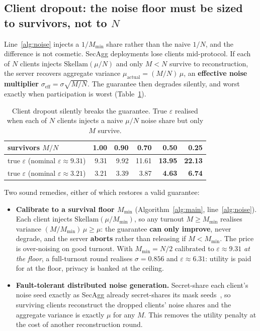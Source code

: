 \documentclass[pdflatex,sn-mathphys-num,12pt]{sn-jnl}
\theoremstyle{thmstyleone}%
\theoremstyle{thmstyletwo}%
\theoremstyle{thmstylethree}%
\newcommand{\eps}{\varepsilon}
\begin{document}
\subsection{Client dropout: the noise floor must be sized to survivors, not to
$N$}\label{sec:dropout}

Line~\ref{alg:noise} injects a $1/M_{\min}$ share rather than the naive $1/N$, and the
difference is not cosmetic. SecAgg deployments lose clients mid-protocol. If each of
$N$ clients injects $\mathrm{Skellam}(\mu/N)$ and only $M < N$ survive to
reconstruction, the server recovers aggregate variance
$\mu_{\text{actual}} = (M/N)\,\mu$, an \textbf{effective noise multiplier}
$\sigma_{\text{eff}} = \sigma\sqrt{M/N}$. The guarantee then degrades silently, and
worst exactly when participation is worst (Table~\ref{tab:dropout}).

\begin{table}[t]
  \centering
  \caption{Client dropout silently breaks the guarantee. True $\eps$ realised when
  each of $N$ clients injects a naive $\mu/N$ noise share but only $M$ survive.}
  \label{tab:dropout}
  \begin{tabular}{@{}lrrrrr@{}}
    \toprule
    survivors $M/N$ & 1.00 & 0.90 & 0.70 & 0.50 & 0.25 \\
    \midrule
    true $\eps$ (nominal $\eps \approx 9.31$) & 9.31 & 9.92 & 11.61 & \textbf{13.95} & \textbf{22.13} \\
    true $\eps$ (nominal $\eps \approx 3.21$) & 3.21 & 3.39 &  3.87 & \textbf{4.63}  & \textbf{6.74}  \\
    \bottomrule
  \end{tabular}
\end{table}

Two sound remedies, either of which restores a valid guarantee:

\begin{itemize}
  \item \textbf{Calibrate to a survival floor $M_{\min}$} (Algorithm~\ref{alg:main},
    line~\ref{alg:noise}). Each client injects $\mathrm{Skellam}(\mu / M_{\min})$, so any
    turnout $M \geq M_{\min}$ realises variance $(M/M_{\min})\,\mu \geq \mu$: the
    guarantee \textbf{can only improve}, never degrade, and the server \textbf{aborts}
    rather than releasing if $M < M_{\min}$. The price is over-noising on good turnout.
    With $M_{\min} = N/2$ calibrated to $\eps \approx 9.31$ \emph{at the floor}, a
    full-turnout round realises $\sigma = 0.856$ and $\eps \approx 6.31$: utility is
    paid for at the floor, privacy is banked at the ceiling.

  \item \textbf{Fault-tolerant distributed noise generation.} Secret-share each client's
    noise seed exactly as SecAgg already secret-shares its mask
    seeds~\cite{bonawitz2017secagg}, so surviving clients reconstruct the dropped
    clients' noise shares and the aggregate variance is exactly $\mu$ for any $M$. This
    removes the utility penalty at the cost of another reconstruction round.
\end{itemize}
\end{document}
